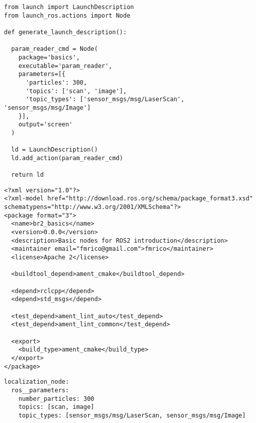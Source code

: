  \footnotesize
\begin{tcolorbox}[sharp corners, colframe=gray!80, colback=LightGray, left=0pt, top=0pt, bottom=0pt, title=\texttt{br2\_basics/launch/param\_node\_v1\_launch.py}]
  \begin{verbatim}
from launch import LaunchDescription
from launch_ros.actions import Node

def generate_launch_description():

  param_reader_cmd = Node(
    package='basics',
    executable='param_reader',
    parameters=[{
      'particles': 300,
      'topics': ['scan', 'image'],
      'topic_types': ['sensor_msgs/msg/LaserScan', 'sensor_msgs/msg/Image']
    }],
    output='screen'
  )
  
  ld = LaunchDescription()
  ld.add_action(param_reader_cmd)

  return ld
    \end{verbatim}
    \end{tcolorbox}
  \normalsize

 \footnotesize
\begin{tcolorbox}[sharp corners, colframe=gray!80, colback=LightGray, left=0pt, top=0pt, bottom=0pt, title=\texttt{br2\_basics/package.xml}]
  \begin{verbatim}
<?xml version="1.0"?>
<?xml-model href="http://download.ros.org/schema/package_format3.xsd" schematypens="http://www.w3.org/2001/XMLSchema"?>
<package format="3">
  <name>br2_basics</name>
  <version>0.0.0</version>
  <description>Basic nodes for ROS2 introduction</description>
  <maintainer email="fmrico@gmail.com">fmrico</maintainer>
  <license>Apache 2</license>

  <buildtool_depend>ament_cmake</buildtool_depend>

  <depend>rclcpp</depend>
  <depend>std_msgs</depend>

  <test_depend>ament_lint_auto</test_depend>
  <test_depend>ament_lint_common</test_depend>

  <export>
    <build_type>ament_cmake</build_type>
  </export>
</package>    \end{verbatim}
    \end{tcolorbox}
  \normalsize

 \footnotesize
\begin{tcolorbox}[sharp corners, colframe=gray!80, colback=LightGray, left=0pt, top=0pt, bottom=0pt, title=\texttt{br2\_basics/config/params.yaml}]
  \begin{verbatim}
localization_node:
  ros__parameters: 
    number_particles: 300 
    topics: [scan, image] 
    topic_types: [sensor_msgs/msg/LaserScan, sensor_msgs/msg/Image] 
    \end{verbatim}
    \end{tcolorbox}
  \normalsize

